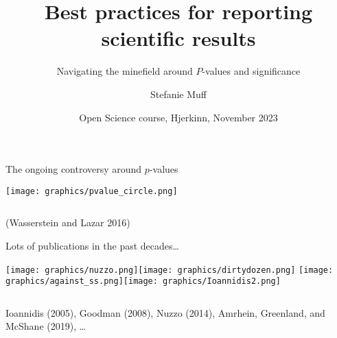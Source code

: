 \documentclass[
  10pt,
  ignorenonframetext,
]{beamer}
\title{Best practices for reporting scientific results}
\subtitle{Navigating the minefield around \(P\)-values and significance}
\author{Stefanie Muff}
\date{Open Science course, Hjerkinn, November 2023}
\begin{document}
\frame{\titlepage}

\begin{frame}
\begin{block}{The ongoing controversy around \(p\)-values}
\protect\hypertarget{the-ongoing-controversy-around-p-values}{}
\(~\)

\centering

\texttt{[image: graphics/pvalue\_circle.png]}

\(~\)

\flushleft
\scriptsize

(Wasserstein and Lazar 2016)
\end{block}
\end{frame}

\begin{frame}
\begin{block}{Lots of publications in the past decades\ldots{}}
\protect\hypertarget{lots-of-publications-in-the-past-decades}{}
\(~\)

\texttt{[image: graphics/nuzzo.png]}\texttt{[image: graphics/dirtydozen.png]}
\texttt{[image: graphics/against\_ss.png]}\texttt{[image: graphics/Ioannidis2.png]}

\(~\)

\scriptsize

Ioannidis (2005), Goodman (2008), Nuzzo (2014), Amrhein, Greenland, and
McShane (2019), \ldots{}
\end{block}
\end{frame}
\end{document}
